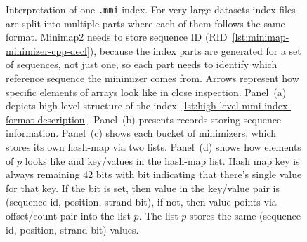 \begin{figure}[htbp]
\caption[Interpretation of one \texttt{.mmi} index]{%
Interpretation of one \texttt{.mmi} index.
For very large datasets index files are split into multiple parts where each of them follows the same format.
Minimap2 needs to store sequence ID (RID~\ref{lst:minimap-minimizer-cpp-decl}), because the index parts are generated for a set of sequences, not just one, so
each part needs to identify which reference sequence the minimizer comes from.
Arrows represent how specific elements of arrays look like in close inspection.
Panel~(a) depicts high-level structure of the index~\ref{lst:high-level-mmi-index-format-description}.
Panel~(b) presents records storing sequence information.
Panel~(c) shows each bucket of minimizers, which stores its own hash-map via two lists.
Panel~(d) shows how elements of $p$ looks like and key/values in the hash-map list.
Hash map key is always remaining 42 bits with bit indicating that there's single value for that key.
If the bit is set, then value in the key/value pair is (sequence id, position, strand bit), if not, then value points via offset/count pair into the list $p$.
The list $p$ stores the same (sequence id, position, strand bit) values.}
\label{fig:index-mmi-layout}
\end{figure}

